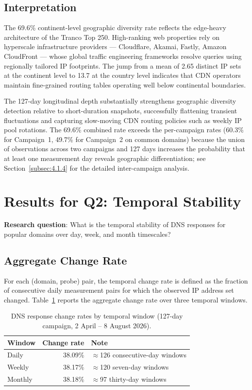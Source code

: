 \subsection{Interpretation}
\label{subsec:4.2.3}

The 69.6\% continent-level geographic diversity rate reflects the edge-heavy architecture of the Tranco Top 250. High-ranking web properties rely on hyperscale infrastructure providers — Cloudflare, Akamai, Fastly, Amazon CloudFront — whose global traffic engineering frameworks resolve queries using regionally tailored \ac{IP} footprints. The jump from a mean of 2.65 distinct \ac{IP} sets at the continent level to 13.7 at the country level indicates that \ac{CDN} operators maintain fine-grained routing tables operating well below continental boundaries.

The 127-day longitudinal depth substantially strengthens geographic diversity detection relative to short-duration snapshots, successfully flattening transient fluctuations and capturing slow-moving \ac{CDN} routing policies such as weekly \ac{IP} pool rotations. The 69.6\% combined rate exceeds the per-campaign rates (60.3\% for Campaign~1, 49.7\% for Campaign~2 on common domains) because the union of observations across two campaigns and 127 days increases the probability that at least one measurement day reveals geographic differentiation; see Section~\ref{subsec:4.1.4} for the detailed inter-campaign analysis.

\bigskip
\section{Results for Q2: Temporal Stability}
\label{sec:4.3}

\textbf{Research question}: What is the temporal stability of \ac{DNS} responses for popular domains over day, week, and month timescales?

\subsection{Aggregate Change Rate}
\label{subsec:4.3.1}

For each (domain, probe) pair, the temporal change rate is defined as the fraction of consecutive daily measurement pairs for which the observed \ac{IP} address set changed. Table~\ref{tab:4.3} reports the aggregate change rate over three temporal windows.

\begin{table}[H]
\centering
\small
\begin{tabular}{l r l}
\toprule
\textbf{Window} & \textbf{Change rate} & \textbf{Note} \\
\midrule
Daily   & 38.09\% & $\approx$126 consecutive-day windows \\
Weekly  & 38.17\% & $\approx$120 seven-day windows \\
Monthly & 38.18\% & $\approx$97 thirty-day windows \\
\bottomrule
\end{tabular}
\caption{\ac{DNS} response change rates by temporal window (127-day campaign, 2 April -- 8 August 2026).}
\label{tab:4.3}
\end{table}

